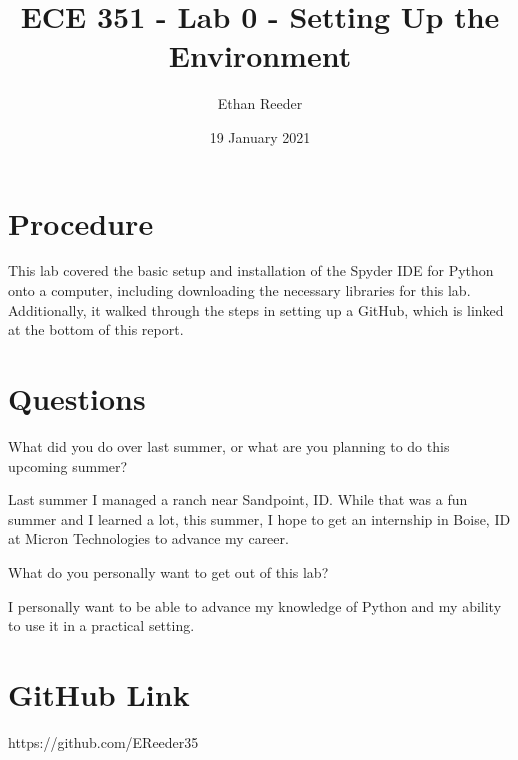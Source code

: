 \documentclass[12pt]{article}
\title{ECE 351 - Lab 0 - Setting Up the Environment}
\author{Ethan Reeder}
\date{19 January 2021}
\begin{document}
\lstset{language=C}

\maketitle

\newpage

\section{Procedure}

This lab covered the basic setup and installation of the Spyder IDE for Python onto a computer, including downloading the necessary libraries for this lab. Additionally, it walked through the steps in setting up a GitHub, which is linked at the bottom of this report.

\section{Questions}

What did you do over last summer, or what are you planning to do this upcoming summer?

Last summer I managed a ranch near Sandpoint, ID. While that was a fun summer and I learned a lot, this summer, I hope to get an internship in Boise, ID at Micron Technologies to advance my career.

What do you personally want to get out of this lab?

I personally want to be able to advance my knowledge of Python and my ability to use it in a practical setting.

\section{GitHub Link}

https://github.com/EReeder35
\end{document}
